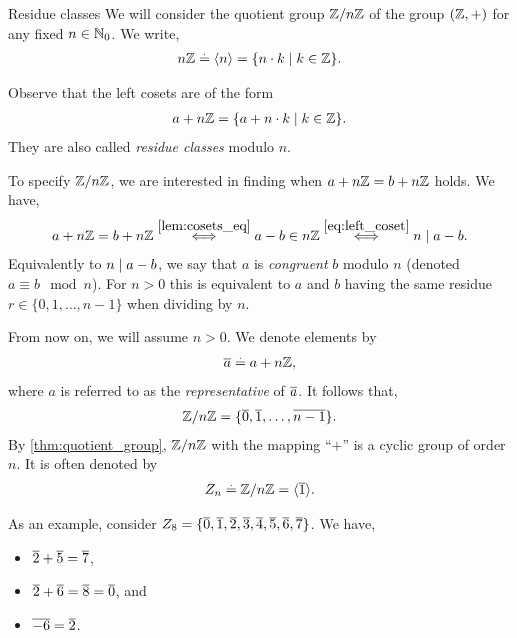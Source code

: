 \begin{ex}{Residue classes}{}
We will consider the quotient group $\mathbb{Z}/n\mathbb{Z}$ of the group $(\mathbb{Z},+)$ for any fixed $n \in \mathbb{N}_0$. We write, \begin{align}
    n\mathbb{Z} \overset{.}{=} \langle n \rangle = \{n \cdot k \mid k \in \mathbb{Z}\}.
\end{align}

Observe that the left cosets are of the form \begin{align}
    a + n\mathbb{Z} = \{a + n \cdot k \mid k \in \mathbb{Z}\}.
\end{align} They are also called \emph{residue classes} modulo $n$.

To specify $\mathbb{Z}/n\mathbb{Z}$, we are interested in finding when ${a + n\mathbb{Z} = b + n\mathbb{Z}}$ holds. We have, \begin{align}
    a + n\mathbb{Z} = b + n\mathbb{Z} \overset{\ref{lem:cosets_eq}}{\iff} a - b \in n\mathbb{Z} \overset{\ref{eq:left_coset}}{\iff} n \mid a - b.
\end{align} Equivalently to ${n \mid a - b}$, we say that $a$ is \emph{congruent} $b$ modulo $n$ (denoted ${a \equiv b \mod n}$). For ${n > 0}$ this is equivalent to $a$ and $b$ having the same residue ${r \in \{0, 1, \dots, n - 1\}}$ when dividing by $n$.

From now on, we will assume ${n > 0}$. We denote elements by \begin{align}
    \overline{a} \overset{.}{=} a + n\mathbb{Z},
\end{align} where $a$ is referred to as the \emph{representative} of $\overline{a}$. It follows that, \begin{align}
    \mathbb{Z}/n\mathbb{Z} = \{\overline{0}, \overline{1}, \dots, \overline{n-1}\}.
\end{align} By \cref{thm:quotient_group}, $\mathbb{Z}/n\mathbb{Z}$ with the mapping ``$+$'' is a cyclic group of order $n$. It is often denoted by \begin{align}
    Z_n \overset{.}{=} \mathbb{Z}/n\mathbb{Z} = \langle \overline{1} \rangle.
\end{align}

As an example, consider $Z_8 = \{\overline{0}, \overline{1}, \overline{2}, \overline{3}, \overline{4}, \overline{5}, \overline{6}, \overline{7}\}$. We have, \vspace{-10pt}\begin{itemize}
    \item $\overline{2} + \overline{5} = \overline{7}$,
    \item $\overline{2} + \overline{6} = \overline{8} = \overline{0}$, and
    \item $\overline{-6} = \overline{2}$.
\end{itemize}
\end{ex}

